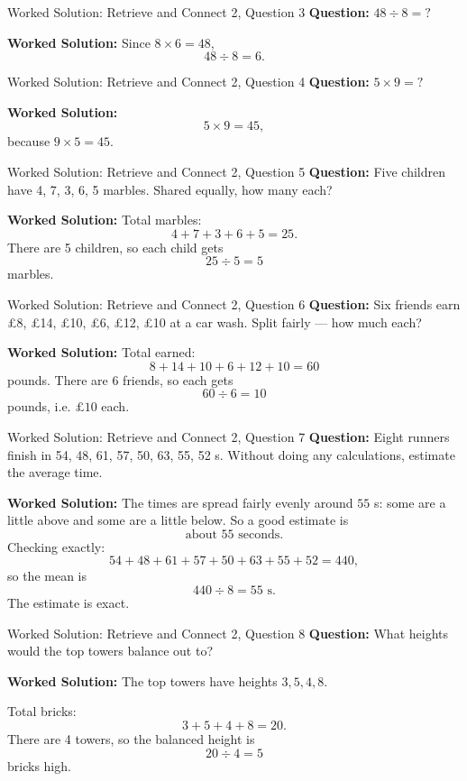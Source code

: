 \documentclass{beamer}
\begin{document}
\begin{frame}{Worked Solution: Retrieve and Connect 2, Question 3}
\textbf{Question:} \(48 \div 8 = ?\)

\textbf{Worked Solution:}
Since \(8 \times 6 = 48\),
\[
48 \div 8 = 6.
\]
\end{frame}

\begin{frame}{Worked Solution: Retrieve and Connect 2, Question 4}
\textbf{Question:} \(5 \times 9 = ?\)

\textbf{Worked Solution:}
\[
5 \times 9 = 45,
\]
because \(9 \times 5 = 45\).
\end{frame}

\begin{frame}{Worked Solution: Retrieve and Connect 2, Question 5}
\textbf{Question:} Five children have 4, 7, 3, 6, 5 marbles. Shared equally, how many each?

\textbf{Worked Solution:}
Total marbles:
\[
4 + 7 + 3 + 6 + 5 = 25.
\]
There are 5 children, so each child gets
\[
25 \div 5 = 5
\]
marbles.
\end{frame}

\begin{frame}{Worked Solution: Retrieve and Connect 2, Question 6}
\textbf{Question:} Six friends earn \pounds8, \pounds14, \pounds10, \pounds6, \pounds12, \pounds10 at a car wash. Split fairly — how much each?

\textbf{Worked Solution:}
Total earned:
\[
8 + 14 + 10 + 6 + 12 + 10 = 60
\]
pounds.
There are 6 friends, so each gets
\[
60 \div 6 = 10
\]
pounds, i.e. \(\pounds10\) each.
\end{frame}

\begin{frame}{Worked Solution: Retrieve and Connect 2, Question 7}
\textbf{Question:} Eight runners finish in 54, 48, 61, 57, 50, 63, 55, 52 s. Without doing any calculations, estimate the average time.

\textbf{Worked Solution:}
The times are spread fairly evenly around \(55\) s: some are a little above and some are a little below. So a good estimate is
\[
\text{about } 55 \text{ seconds}.
\]
Checking exactly:
\[
54+48+61+57+50+63+55+52=440,
\]
so the mean is
\[
440 \div 8 = 55 \text{ s}.
\]
The estimate is exact.
\end{frame}

\begin{frame}{Worked Solution: Retrieve and Connect 2, Question 8}
\textbf{Question:} What heights would the top towers balance out to?

\textbf{Worked Solution:}
The top towers have heights \(3, 5, 4, 8\).

Total bricks:
\[
3 + 5 + 4 + 8 = 20.
\]
There are 4 towers, so the balanced height is
\[
20 \div 4 = 5
\]
bricks high.
\end{frame}
\end{document}
